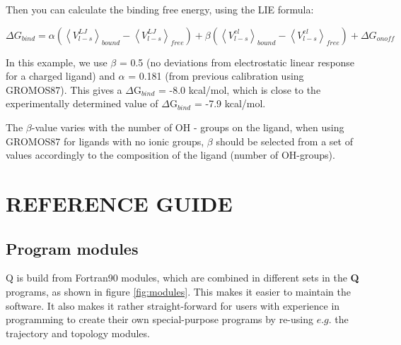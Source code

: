 \documentclass[a4paper,10pt]{article}
\begin{document}


Then you can calculate the binding free energy, using the LIE
formula:

\begin {equation}
\label{eq:LIE} \Delta G_{bind} = \alpha \left( {\left\langle
{V_{l-s}^{LJ}} \right\rangle_{bound} - \left\langle {V_{l-s}^{LJ}}
\right\rangle_{free}} \right) + \beta\left( {\left\langle
{V_{l-s}^{el}} \right\rangle_{bound} - \left\langle {V_{l-s}^{el}}
\right\rangle_{free}} \right) + \Delta G_{onoff}
\end{equation}

In this example, we use $\beta $ = 0.5 (no deviations from
electrostatic linear response for a charged ligand) and $\alpha $
= 0.181 (from previous calibration using GROMOS87). This gives a
$\Delta $G$_{bind}$ = -8.0 kcal/mol, which is close to the
experimentally determined value of $\Delta $G$_{bind}$ = -7.9
kcal/mol.

The $\beta $-value varies with the number of OH - groups on the
ligand, when using GROMOS87 for ligands with no ionic groups,
$\beta $ should be selected from a set of values accordingly to
the composition of the ligand (number of
OH-groups).\cite{Hansson:1998}


\section{REFERENCE GUIDE}
\subsection{Program modules}
Q is  build from  Fortran90 modules, which  are combined  in different
sets in  the \textbf{Q}  programs, as shown  in figure  \ref{fig:modules}. This
makes it  easier to  maintain the  software. It  also makes  it rather
straight-forward for  users with  experience in programming  to create
their own  special-purpose programs by re-using  $e.g.$ the trajectory
and topology modules.
\end{document}
